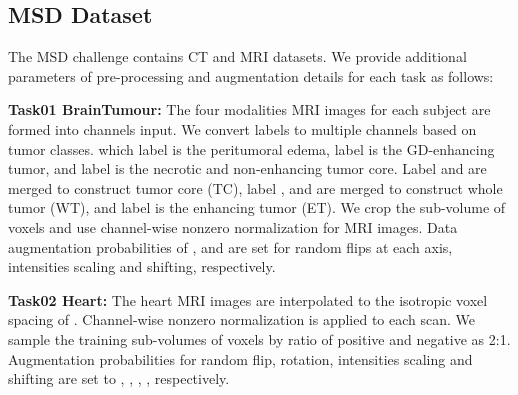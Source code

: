 \documentclass[10pt,twocolumn,letterpaper]{article}
\begin{document}
\begin{table}[t!]
 \centering
{}
\caption{ Comparison of number of parameters, FLOPs and averaged inference time for various models in BTCV experiments.}
\label{tab:complexity}
\end{table}


\subsection{MSD Dataset}
The MSD challenge contains  CT and  MRI datasets. We provide additional parameters of pre-processing and augmentation details for each task as follows:

\noindent\textbf{Task01 BrainTumour: } The four modalities MRI images for each subject are formed into  channels input. We convert labels to multiple channels based on tumor classes. which label  is the peritumoral edema, label  is the GD-enhancing tumor, and label  is the necrotic and non-enhancing tumor core. Label  and  are merged to construct tumor core (TC), label ,  and  are merged to construct whole tumor (WT), and label  is the enhancing tumor (ET). We crop the sub-volume of  voxels and use channel-wise nonzero normalization for MRI images. Data augmentation probabilities of ,  and  are set for random flips at each axis, intensities scaling and shifting, respectively. 

\noindent\textbf{Task02 Heart: } The heart MRI images are interpolated to the isotropic voxel spacing of  . Channel-wise nonzero normalization is applied to each scan. We sample the training sub-volumes of  voxels by ratio of positive and negative as 2:1. Augmentation probabilities for random flip, rotation, intensities scaling and shifting are set to , , , , respectively.
\end{document}
